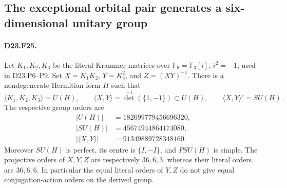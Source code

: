 \subsection{The exceptional orbital pair generates a six-dimensional unitary group}

\paragraph{D23.F25.}
Let $K_1,K_2,K_3$ be the literal Krammer matrices over
$\mathbb F_9=\mathbb F_3[i]$, $i^2=-1$, used in D23.P6--P9.
Set $X=K_1K_2$, $Y=K_3^2$, and $Z=(XY)^{-1}$.
There is a nondegenerate Hermitian form $H$ such that
\[
 \langle K_1,K_2,K_3\rangle=U(H),\qquad
 \langle X,Y\rangle=\det^{-1}(\{1,-1\})\subset U(H),
 \qquad \langle X,Y\rangle'=SU(H).
\tag{D23.F25.1}
\]
The respective group orders are
\[
 \begin{aligned}
 |U(H)|&=182699779456696320,\\
 |SU(H)|&=45674944864174080,\\
 |\langle X,Y\rangle|&=91349889728348160.
 \end{aligned}
\tag{D23.F25.2}
\]
Moreover $SU(H)$ is perfect, its centre is $\{I,-I\}$, and
$PSU(H)$ is simple.  The projective orders of $X,Y,Z$ are
respectively $36,6,3$, whereas their literal orders are $36,6,6$.
In particular the equal literal orders of $Y,Z$ do not give equal
conjugation-action orders on the derived group.

